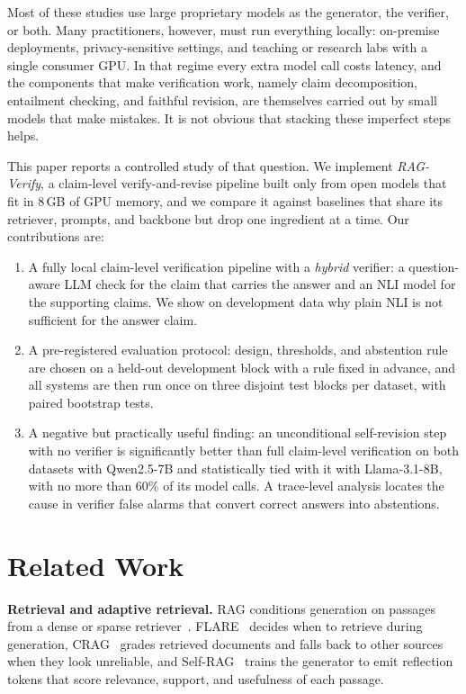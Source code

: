 \documentclass[conference]{IEEEtran}
\begin{document}
Most of these studies use large proprietary models as the generator, the verifier, or both. Many practitioners, however, must run everything locally: on-premise deployments, privacy-sensitive settings, and teaching or research labs with a single consumer GPU. In that regime every extra model call costs latency, and the components that make verification work, namely claim decomposition, entailment checking, and faithful revision, are themselves carried out by small models that make mistakes. It is not obvious that stacking these imperfect steps helps.

This paper reports a controlled study of that question. We implement \emph{RAG-Verify}, a claim-level verify-and-revise pipeline built only from open models that fit in 8\,GB of GPU memory, and we compare it against baselines that share its retriever, prompts, and backbone but drop one ingredient at a time. Our contributions are:
\begin{enumerate}
\item A fully local claim-level verification pipeline with a \emph{hybrid} verifier: a question-aware LLM check for the claim that carries the answer and an NLI model for the supporting claims. We show on development data why plain NLI is not sufficient for the answer claim.
\item A pre-registered evaluation protocol: design, thresholds, and abstention rule are chosen on a held-out development block with a rule fixed in advance, and all systems are then run once on three disjoint test blocks per dataset, with paired bootstrap tests.
\item A negative but practically useful finding: an unconditional self-revision step with no verifier is significantly better than full claim-level verification on both datasets with Qwen2.5-7B and statistically tied with it with Llama-3.1-8B, with no more than 60\% of its model calls. A trace-level analysis locates the cause in verifier false alarms that convert correct answers into abstentions.
\end{enumerate}

\section{Related Work}
\textbf{Retrieval and adaptive retrieval.} RAG conditions generation on passages from a dense or sparse retriever~\cite{lewis2020rag,gao2023ragsurvey}. FLARE~\cite{jiang2023flare} decides when to retrieve during generation, CRAG~\cite{yan2024crag} grades retrieved documents and falls back to other sources when they look unreliable, and Self-RAG~\cite{asai2023selfrag} trains the generator to emit reflection tokens that score relevance, support, and usefulness of each passage.
\end{document}
